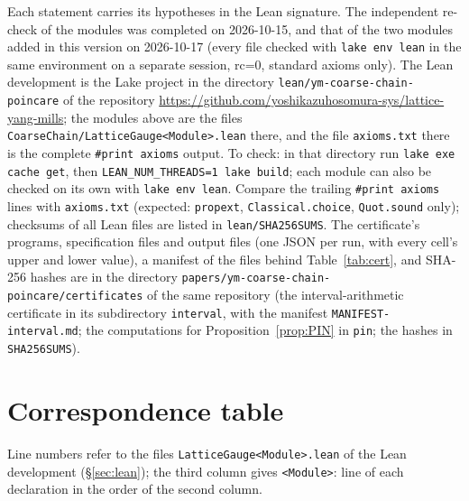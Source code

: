 \documentclass[11pt,a4paper]{article}
\theoremstyle{definition}
\theoremstyle{remark}
\newcommand{\code}[1]{\texttt{#1}}
\begin{document}
Each statement carries its hypotheses in the Lean signature. The independent re-check of the modules was completed on 2026-10-15, and that of the two modules added in this version on 2026-10-17 (every file checked with \code{lake env lean} in the same environment on a separate session, rc=0, standard axioms only). The Lean development is the Lake project in the directory \code{lean/ym-coarse-chain-poincare} of the repository \url{https://github.com/yoshikazuhosomura-sys/lattice-yang-mills}; the modules above are the files \code{CoarseChain/LatticeGauge<Module>.lean} there, and the file \code{axioms.txt} there is the complete \code{\#print axioms} output. To check: in that directory run \code{lake exe cache get}, then \code{LEAN\_NUM\_THREADS=1 lake build}; each module can also be checked on its own with \code{lake env lean}. Compare the trailing \code{\#print axioms} lines with \code{axioms.txt} (expected: \code{propext}, \code{Classical.choice}, \code{Quot.sound} only); checksums of all Lean files are listed in \code{lean/SHA256SUMS}. The certificate's programs, specification files and output files (one JSON per run, with every cell's upper and lower value), a manifest of the files behind Table~\ref{tab:cert}, and SHA-256 hashes are in the directory \code{papers/ym-coarse-chain-poincare/certificates} of the same repository (the interval-arithmetic certificate in its subdirectory \code{interval}, with the manifest \code{MANIFEST-interval.md}; the computations for Proposition~\ref{prop:PIN} in \code{pin}; the hashes in \code{SHA256SUMS}).\par\endgroup

\section{Correspondence table}\label{sec:corr}

Line numbers refer to the files \code{LatticeGauge<Module>.lean} of the Lean development (\S\ref{sec:lean}); the third column gives \code{<Module>}: line of each declaration in the order of the second column.
\end{document}
